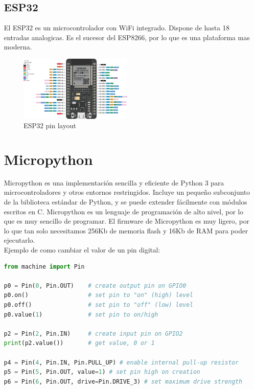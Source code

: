 \begin{titlepage}
\subsection{ESP32}
El ESP32\cite{ref11} es un microcontrolador con WiFi integrado. Dispone de hasta 18 entradas analogicas. Es el sucesor del ESP8266, por lo que es una plataforma mas moderna. \\
\begin{figure}[h!]
	\centering
	\includegraphics[width=0.5\textwidth]{imagenes/esp32.png}
	\caption{ESP32 pin layout\cite{esp32_img}}
\end{figure}

\section{Micropython}
Micropython \cite{ref12} es una implementación sencilla y eficiente de Python 3 para microcontroladores y otros entornos restringidos. Incluye un pequeño subconjunto de la biblioteca estándar de Python, y se puede extender fácilmente con módulos escritos en C. Micropython es un lenguaje de programación de alto nivel, por lo que es muy sencillo de programar. El firmware de Micropython es muy ligero, por lo que tan solo necesitamos 256Kb de memoria flash y 16Kb de RAM para poder ejecutarlo. \\

Ejemplo de como cambiar el valor de un pin digital\cite{ref13}:
\begin{lstlisting}[language=Python]
from machine import Pin

p0 = Pin(0, Pin.OUT)    # create output pin on GPIO0
p0.on()                 # set pin to "on" (high) level
p0.off()                # set pin to "off" (low) level
p0.value(1)             # set pin to on/high

p2 = Pin(2, Pin.IN)     # create input pin on GPIO2
print(p2.value())       # get value, 0 or 1

p4 = Pin(4, Pin.IN, Pin.PULL_UP) # enable internal pull-up resistor
p5 = Pin(5, Pin.OUT, value=1) # set pin high on creation
p6 = Pin(6, Pin.OUT, drive=Pin.DRIVE_3) # set maximum drive strength


\end{lstlisting}
\end{titlepage}
